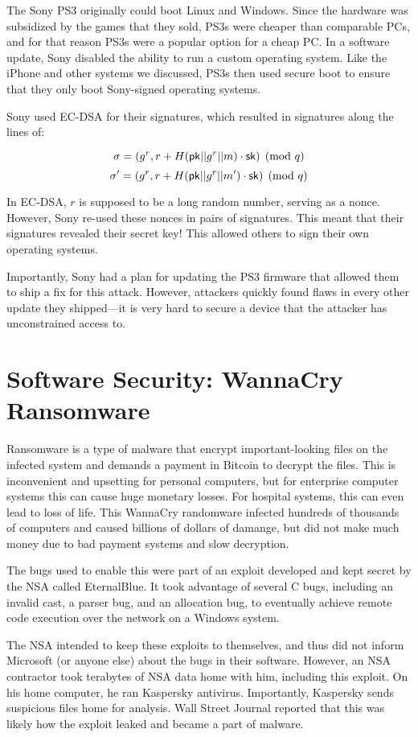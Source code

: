 The Sony PS3 originally could boot Linux and Windows. Since the hardware was subsidized by the games that they sold, PS3s were cheaper than comparable PCs, and for that reason PS3s were a popular option for a cheap PC. In a software update, Sony disabled the ability to run a custom operating system. Like the iPhone and other systems we discussed, PS3s then used secure boot to ensure that they only boot Sony-signed operating systems. 

Sony used EC-DSA for their signatures, which resulted in signatures along the lines of:

\[ \sigma = (g^r, r + H(\mathsf{pk} || g^r || m)\cdot {\ensuremath{\mathsf{sk}}}) \pmod{q} \]
\[ \sigma' = (g^r, r + H(\mathsf{pk} || g^r || m')\cdot {\ensuremath{\mathsf{sk}}}) \pmod{q} \]

In EC-DSA, $r$ is supposed to be a long random number, serving as a nonce. However, Sony re-used these nonces in pairs of signatures. This meant that their signatures revealed their secret key! This allowed others to sign their own operating systems. 

Importantly, Sony had a plan for updating the PS3 firmware that allowed them to ship a fix for this attack. However, attackers quickly found flaws in every other update they shipped---it is very hard to secure a device that the attacker has unconstrained access to.

\section{Software Security: WannaCry Ransomware}

Ransomware is a type of malware that encrypt important-looking files on the infected system and demands a payment in Bitcoin to decrypt the files. This is inconvenient and upsetting for personal computers, but for enterprise computer systems this can cause huge monetary losses. For hospital systems, this can even lead to loss of life. This WannaCry randomware infected hundreds of thousands of computers and caused billions of dollars of damange, but did not make much money due to bad payment systems and slow decryption. 

The bugs used to enable this were part of an exploit developed and kept secret by the NSA called EternalBlue. It took advantage of several C bugs, including an invalid cast, a parser bug, and an allocation bug, to eventually achieve remote code execution over the network on a Windows system.

The NSA intended to keep these exploits to themselves, and thus did not inform Microsoft (or anyone else) about the bugs in their software. However, an NSA contractor took terabytes of NSA data home with him, including this exploit. On his home computer, he ran Kaspersky antivirus. Importantly, Kaspersky sends suspicious files home for analysis. Wall Street Journal reported that this was likely how the exploit leaked and became a part of malware.

